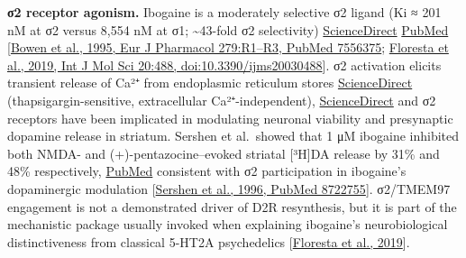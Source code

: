 \textbf{σ2 receptor agonism.} Ibogaine is a moderately selective σ2 ligand (Ki ≈ 201 nM at σ2 versus 8,554 nM at σ1; \textasciitilde43-fold σ2 selectivity) \href{https://www.sciencedirect.com/science/article/abs/pii/001429999500247I}{ScienceDirect} \href{https://pubmed.ncbi.nlm.nih.gov/7556375/}{PubMed} {[}\href{https://pubmed.ncbi.nlm.nih.gov/7556375/}{Bowen et al., 1995, Eur J Pharmacol 279:R1--R3, PubMed 7556375}; \href{https://www.mdpi.com/1422-0067/20/3/488}{Floresta et al., 2019, Int J Mol Sci 20:488, doi:10.3390/ijms20030488}{]}. σ2 activation elicits transient release of Ca²⁺ from endoplasmic reticulum stores \href{https://www.sciencedirect.com/science/article/abs/pii/001429999500247I}{ScienceDirect} (thapsigargin-sensitive, extracellular Ca²⁺-independent), \href{https://www.sciencedirect.com/science/article/abs/pii/001429999500247I}{ScienceDirect} and σ2 receptors have been implicated in modulating neuronal viability and presynaptic dopamine release in striatum. Sershen et al.~showed that 1 μM ibogaine inhibited both NMDA- and (+)-pentazocine--evoked striatal {[}³H{]}DA release by 31\% and 48\% respectively, \href{https://pubmed.ncbi.nlm.nih.gov/8722755/}{PubMed} consistent with σ2 participation in ibogaine's dopaminergic modulation {[}\href{https://pubmed.ncbi.nlm.nih.gov/8722755/}{Sershen et al., 1996, PubMed 8722755}{]}. σ2/TMEM97 engagement is not a demonstrated driver of D2R resynthesis, but it is part of the mechanistic package usually invoked when explaining ibogaine's neurobiological distinctiveness from classical 5-HT2A psychedelics {[}\href{https://pmc.ncbi.nlm.nih.gov/articles/PMC6386901/}{Floresta et al., 2019}{]}.

